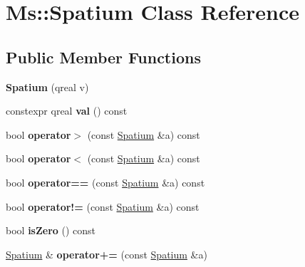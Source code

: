 \hypertarget{class_ms_1_1_spatium}{}\section{Ms\+:\+:Spatium Class Reference}
\label{class_ms_1_1_spatium}
\subsection*{Public Member Functions}
\begin{DoxyCompactItemize}
\item 
\mbox{\label{class_ms_1_1_spatium_a97571ce2d78b24ff8a935a3a475e88ae}} 
{\bfseries Spatium} (qreal v)
\item 
\mbox{\label{class_ms_1_1_spatium_ab21fa50b8ec92de51fb08a2365770422}} 
constexpr qreal {\bfseries val} () const
\item 
\mbox{\label{class_ms_1_1_spatium_a911472dc5090661357c7e5493e7434e5}} 
bool {\bfseries operator$>$} (const \hyperlink{class_ms_1_1_spatium}{Spatium} \&a) const
\item 
\mbox{\label{class_ms_1_1_spatium_aada2dc92816ac1129fb477ac80aa1fb8}} 
bool {\bfseries operator$<$} (const \hyperlink{class_ms_1_1_spatium}{Spatium} \&a) const
\item 
\mbox{\label{class_ms_1_1_spatium_abfe21d15cc6c9b7623a476273148bbad}} 
bool {\bfseries operator==} (const \hyperlink{class_ms_1_1_spatium}{Spatium} \&a) const
\item 
\mbox{\label{class_ms_1_1_spatium_ad06d2714a2872ceb6deaa1b69c6d5469}} 
bool {\bfseries operator!=} (const \hyperlink{class_ms_1_1_spatium}{Spatium} \&a) const
\item 
\mbox{\label{class_ms_1_1_spatium_a0f5062c2de370f4b2c82af49761c8187}} 
bool {\bfseries is\+Zero} () const
\item 
\mbox{\label{class_ms_1_1_spatium_ac709e2bb26c1c1697b66c2e18e2ae844}} 
\hyperlink{class_ms_1_1_spatium}{Spatium} \& {\bfseries operator+=} (const \hyperlink{class_ms_1_1_spatium}{Spatium} \&a)

\end{DoxyCompactItemize}
